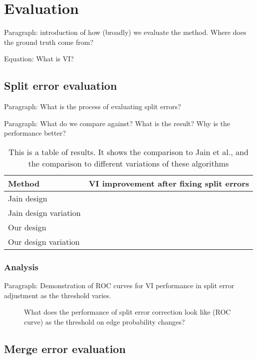 \section{Evaluation}

Paragraph: introduction of how (broadly) we evaluate the method. Where does the ground truth come from?

Equation: What is VI?

\subsection{Split error evaluation}

Paragraph: What is the process of evaluating split errors?

Paragraph: What do we compare against? What is the result? Why is the performance better?

\begin{table}[t]
\begin{tabular}{ll}
\toprule
Method & VI improvement after fixing split errors \\
\midrule
Jain design & \\
Jain design variation & \\
Our design &  \\
Our design variation & \\
\bottomrule
\end{tabular}
\caption{This is a table of results. It shows the comparison to Jain et al., and the comparison to different variations of these algorithms}
\label{tab:spliterrorcorrectionperformance}
\end{table}

\subsubsection{Analysis}

Paragraph: Demonstration of ROC curves for VI performance in split error adjustment as the threshold varies.

\begin{figure}[t]
\missingfigure{}
\caption{What does the performance of split error correction look like (ROC curve) as the threshold on edge probability changes?}
\end{figure}

\subsection{Merge error evaluation}

